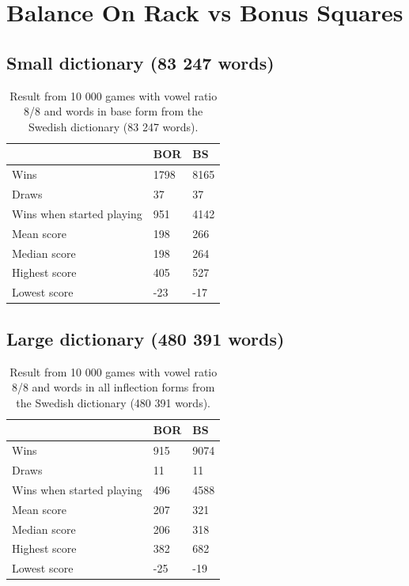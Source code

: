 \documentclass[a4paper, 12pt]{report}
\begin{document}
\FloatBarrier
\section{Balance On Rack vs Bonus Squares} 
\label{sec:tablesbs}
\subsection{Small dictionary (83 247 words)}

\begin{table}[h]
\centering
    \begin{tabular}{ l | l | l }
   	& BOR & BS \\
   	\hline
   	Wins & 1798 & 8165 \\
	Draws & 37 & 37 \\
	Wins when started playing & 951 & 4142 \\   	
	Mean score & 198 & 266 \\
	Median score & 198 & 264\\	 	 
	Highest score & 405 & 527 \\
	Lowest score & -23 & -17 \\		
    \end{tabular}
\caption{Result from 10 000 games with vowel ratio 8/8 and words in base form from the Swedish dictionary (83 247 words).}
\label{tab:borbsstats8smallDict}
\end{table}

\subsection{Large dictionary (480 391 words)}
\begin{table}[h]
\centering
    \begin{tabular}{ l | l | l }
   	& BOR & BS \\
   	\hline
   	Wins & 915 & 9074 \\
	Draws & 11 & 11 \\
	Wins when started playing & 496 & 4588 \\   	
	Mean score & 207 & 321 \\
	Median score & 206 & 318\\	 	 
	Highest score & 382 & 682 \\
	Lowest score & -25 & -19 \\		
    \end{tabular}
\caption{Result from 10 000 games with vowel ratio 8/8 and words in all inflection forms from the Swedish dictionary (480 391 words).}
\label{tab:borbsstats8}
\end{table}
\end{document}
